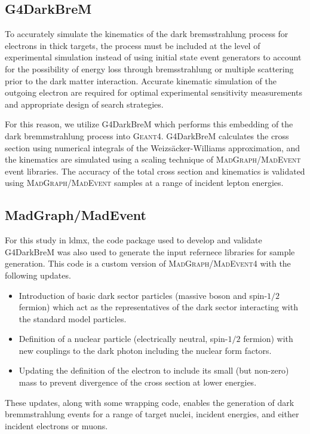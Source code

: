 \subsection{G4DarkBreM}
To accurately simulate the kinematics of the dark bremsstrahlung process for electrons in thick
targets, the process must be included at the level of experimental simulation instead of using
initial state event generators to account for the possibility of energy loss through bremsstrahlung
or multiple scattering prior to the dark matter interaction. Accurate kinematic simulation of the
outgoing electron are required for optimal experimental sensitivity measurements and appropriate
design of search strategies.

For this reason, we utilize G4DarkBreM \cite{g4darkbrem} which performs this embedding of the dark
bremmstrahlung process into \textsc{Geant}4. G4DarkBreM calculates the cross section using
numerical integrals of the Weizs\"{a}cker-Williams approximation, and the kinematics are simulated
using a scaling technique of \textsc{MadGraph/MadEvent} event libraries. The accuracy of the total
cross section and kinematics is validated using \textsc{MadGraph/MadEvent} samples at a range of
incident lepton energies.

\subsection{MadGraph/MadEvent}
For this study in \ac{ldmx}, the code package used to develop and validate G4DarkBreM was also used
to generate the input refernece libraries for sample generation. This code is a custom version of
\textsc{MadGraph/MadEvent4} with the following updates.
\begin{itemize}
  \item Introduction of basic dark sector particles (massive boson and spin-$1/2$ fermion) which act as the
        representatives of the dark sector interacting with the standard model particles.
  \item Definition of a nuclear particle (electrically neutral, spin-$1/2$ fermion) with new couplings to
        the dark photon including the nuclear form factors.
  \item Updating the definition of the electron to include its small (but non-zero) mass to prevent
        divergence of the cross section at lower energies.
\end{itemize}
These updates, along with some wrapping code, enables the generation of
dark bremmstrahlung events for a range of target nuclei, incident energies,
and either incident electrons or muons.

